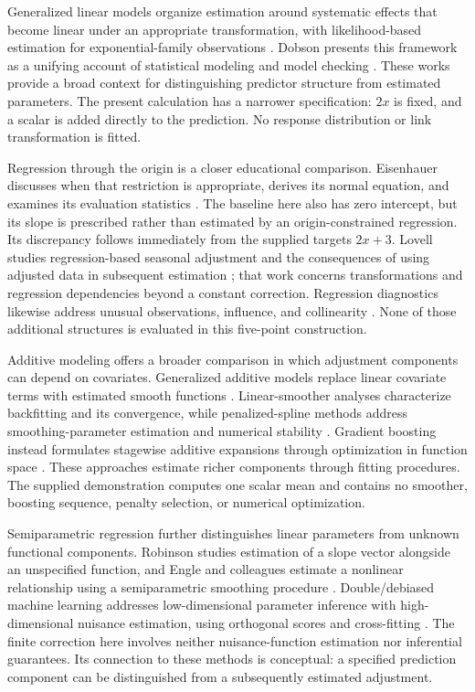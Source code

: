 \documentclass[11pt]{article}
\begin{document}
Generalized linear models organize estimation around systematic effects that become linear under an appropriate transformation, with likelihood-based estimation for exponential-family observations \cite{Nelder1972GeneralizedLinear}. Dobson presents this framework as a unifying account of statistical modeling and model checking \cite{Dobson2001IntroductionGeneralized}. These works provide a broad context for distinguishing predictor structure from estimated parameters. The present calculation has a narrower specification: $2x$ is fixed, and a scalar is added directly to the prediction. No response distribution or link transformation is fitted.

Regression through the origin is a closer educational comparison. Eisenhauer discusses when that restriction is appropriate, derives its normal equation, and examines its evaluation statistics \cite{Eisenhauer2003RegressionThrough}. The baseline here also has zero intercept, but its slope is prescribed rather than estimated by an origin-constrained regression. Its discrepancy follows immediately from the supplied targets $2x+3$. Lovell studies regression-based seasonal adjustment and the consequences of using adjusted data in subsequent estimation \cite{Lovell1963SeasonalAdjustment}; that work concerns transformations and regression dependencies beyond a constant correction. Regression diagnostics likewise address unusual observations, influence, and collinearity \cite{Belsley1980RegressionDiagnostics}. None of those additional structures is evaluated in this five-point construction.

Additive modeling offers a broader comparison in which adjustment components can depend on covariates. Generalized additive models replace linear covariate terms with estimated smooth functions \cite{Hastie1986GeneralizedAdditive}. Linear-smoother analyses characterize backfitting and its convergence, while penalized-spline methods address smoothing-parameter estimation and numerical stability \cite{Buja1989LinearSmoothers,Wood2004StableEfficient}. Gradient boosting instead formulates stagewise additive expansions through optimization in function space \cite{Friedman2001GreedyFunction}. These approaches estimate richer components through fitting procedures. The supplied demonstration computes one scalar mean and contains no smoother, boosting sequence, penalty selection, or numerical optimization.

Semiparametric regression further distinguishes linear parameters from unknown functional components. Robinson studies estimation of a slope vector alongside an unspecified function, and Engle and colleagues estimate a nonlinear relationship using a semiparametric smoothing procedure \cite{Robinson1988RootnconsistentSemiparametric,Engle1986SemiparametricEstimates}. Double/debiased machine learning addresses low-dimensional parameter inference with high-dimensional nuisance estimation, using orthogonal scores and cross-fitting \cite{Chernozhukov2018DoubledebiasedMachine}. The finite correction here involves neither nuisance-function estimation nor inferential guarantees. Its connection to these methods is conceptual: a specified prediction component can be distinguished from a subsequently estimated adjustment.
\end{document}
